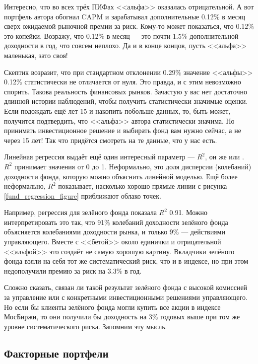 Интересно, что во всех трёх ПИФах <<альфа>> оказалась отрицательной. А вот 
портфель автора обогнал CAPM и зарабатывал дополнительные 0.12\% в месяц сверх 
ожидаемой рыночной премии за риск. Кому-то может показаться, что 0.12\% это 
копейки. Возражу, что 0.12\% в месяц --- это почти 1.5\% дополнительной 
доходности в год, что совсем неплохо. Да и в конце концов, пусть <<альфа>> 
маленькая, зато своя!

Скептик возразит, что при стандартном отклонении 0.29\% значение <<альфы>> 
0.12\% статистически не отличается от нуля. Это правда, и с этим невозможно 
спорить. Такова реальность финансовых рынков. Зачастую у вас нет достаточно 
длинной истории наблюдений, чтобы получить статистически значимые оценки. Если 
подождать ещё лет 15 и накопить побольше данных, то, быть может, получится 
подтвердить, что <<альфа>> автора статистически значима. Но принимать 
инвестиционное решение и выбирать фонд вам нужно сейчас, а не через 15 лет! Так 
что придётся смотреть на те данные, что у нас есть.

Линейная регрессия выдаёт ещё один интересный параметр --- $R^2$, он же 
 или . $R^2$ принимает значения от 0 до 1. Неформально, это доля 
дисперсии (колебаний) доходности фонда, которую можно объяснить линейной 
моделью. Ещё более неформально, $R^2$ показывает, насколько хорошо прямые линии 
с рисунка \ref{fund_regression_figure} приближают облако точек.

Например, регрессия для зелёного фонда показала $R^2$ 0.91. Можно 
интерпретировать это так, что 91\% колебаний доходности зелёного фонда 
объясняется колебаниями доходности рынка, и только 9\% --- действиями 
управляющего. Вместе с <<бетой>> около единички и отрицательной <<альфой>> это 
создаёт не самую хорошую картину. Вкладчики зелёного фонда взяли на себя тот же 
систематический риск, что и в индексе, но при этом недополучили премию за риск 
на 3.3\% в год. 

Сложно сказать, связан ли такой результат зелёного фонда с высокой комиссией за 
управление или с конкретными инвестиционными решениями управляющего. Но если бы 
клиенты зелёного фонда могли купить все акции в индексе МосБиржи, то они 
получили бы доходность на 3\% годовых выше при том же уровне систематического 
риска. Запомним эту мысль.

\subsection{Факторные портфели}

